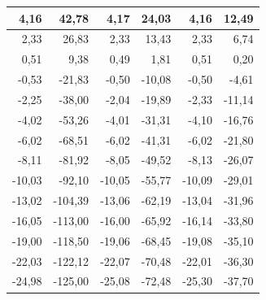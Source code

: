 \documentclass[12pt, a4paper]{article}
\begin{document}
\begin{table}[H]
\begin{tabular}{|rr|rr|rr|}
\multicolumn{1}{|r|}{4,16}   & 42,78                        & \multicolumn{1}{r|}{4,17}   & 24,03                        & \multicolumn{1}{r|}{4,16}   & 12,49                        \\ \hline
\multicolumn{1}{|r|}{2,33}   & 26,83                        & \multicolumn{1}{r|}{2,33}   & 13,43                        & \multicolumn{1}{r|}{2,33}   & 6,74                         \\ \hline
\multicolumn{1}{|r|}{0,51}   & 9,38                         & \multicolumn{1}{r|}{0,49}   & 1,81                         & \multicolumn{1}{r|}{0,51}   & 0,20                         \\ \hline
\multicolumn{1}{|r|}{-0,53}  & -21,83                       & \multicolumn{1}{r|}{-0,50}  & -10,08                       & \multicolumn{1}{r|}{-0,50}  & -4,61                        \\ \hline
\multicolumn{1}{|r|}{-2,25}  & -38,00                       & \multicolumn{1}{r|}{-2,04}  & -19,89                       & \multicolumn{1}{r|}{-2,33}  & -11,14                       \\ \hline
\multicolumn{1}{|r|}{-4,02}  & -53,26                       & \multicolumn{1}{r|}{-4,01}  & -31,31                       & \multicolumn{1}{r|}{-4,10}  & -16,76                       \\ \hline
\multicolumn{1}{|r|}{-6,02}  & -68,51                       & \multicolumn{1}{r|}{-6,02}  & -41,31                       & \multicolumn{1}{r|}{-6,02}  & -21,80                       \\ \hline
\multicolumn{1}{|r|}{-8,11}  & -81,92                       & \multicolumn{1}{r|}{-8,05}  & -49,52                       & \multicolumn{1}{r|}{-8,13}  & -26,07                       \\ \hline
\multicolumn{1}{|r|}{-10,03} & -92,10                       & \multicolumn{1}{r|}{-10,05} & -55,77                       & \multicolumn{1}{r|}{-10,09} & -29,01                       \\ \hline
\multicolumn{1}{|r|}{-13,02} & -104,39                      & \multicolumn{1}{r|}{-13,06} & -62,19                       & \multicolumn{1}{r|}{-13,04} & -31,96                       \\ \hline
\multicolumn{1}{|r|}{-16,05} & -113,00                      & \multicolumn{1}{r|}{-16,00} & -65,92                       & \multicolumn{1}{r|}{-16,14} & -33,80                       \\ \hline
\multicolumn{1}{|r|}{-19,00} & -118,50                      & \multicolumn{1}{r|}{-19,06} & -68,45                       & \multicolumn{1}{r|}{-19,08} & -35,10                       \\ \hline
\multicolumn{1}{|r|}{-22,03} & -122,12                      & \multicolumn{1}{r|}{-22,07} & -70,48                       & \multicolumn{1}{r|}{-22,01} & -36,30                       \\ \hline
\multicolumn{1}{|r|}{-24,98} & -125,00                      & \multicolumn{1}{r|}{-25,08} & -72,48                       & \multicolumn{1}{r|}{-25,30} & -37,70                       \\ \hline
\end{tabular}
\end{table}
\end{document}
